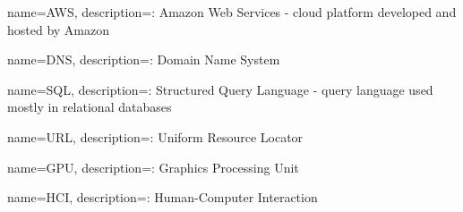 {
name=AWS,
description={: Amazon Web Services - cloud platform developed and hosted by Amazon}
}

{
name=DNS,
description={: Domain Name System}
}

{
name=SQL,
description={: Structured Query Language - query language used mostly in relational databases}
}

{
name=URL,
description={: Uniform Resource Locator}
}

{
name=GPU,
description={: Graphics Processing Unit}
}

 {
name=HCI,
description={: Human-Computer Interaction}
}

